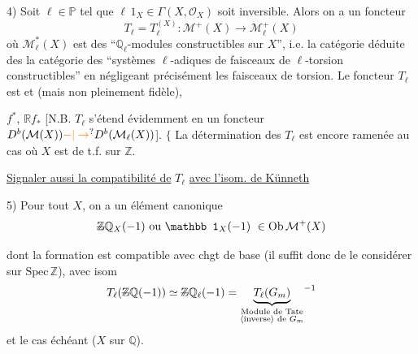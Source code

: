4) Soit $\ell\in\mathbb P$ tel que $\ell\,1_X\in\Gamma(X,\mathscr O_X)$ soit %
inversible. Alors on a un foncteur %
\[
T_\ell=T_\ell^{(X)}:\mathcal M^+(X)\longrightarrow\mathcal M_\ell^+(X) %
\]
où $\mathcal M_\ell^{*}(X)$ est   des ``$\mathbb Q_\ell$-modules %
constructibles sur $X$'', i.e. la catégorie %
déduite des la catégorie des ``systèmes %
$\ell$-adiques de faisceaux de $\ell$-torsion %
constructibles'' en négligeant précisément %
les faisceaux de torsion. Le foncteur %
$T_\ell$ est   et  (mais non %
pleinement fidèle),  %

 $f^*$,  %
 $\mathbb R f_*$ [N.B. $T_\ell$ s'étend %
évidemment en un foncteur %
$D^b(\mathcal M(X))\unsure{-|\to}D^b(\mathcal M_\ell(X))$]. $\{$ La détermination %
des $T_\ell$ est encore ramenée au cas où %
$X$ est de t.f. sur $\mathbb Z$. %

\uline{Signaler aussi la compatibilité de} $T_\ell$ \uline{avec l'isom. de Künneth} %

5) Pour tout $X$, on a un  %
élément canonique %
\[
\deleted{\mathbb Z}\mathbb Q_X(-1)\ \text{ou}\ \mathbb 1_X(-1)\ \in\mathrm{Ob}\,\mathcal M^+(X) %
\]

dont la formation est compatible avec chgt %
de base (il suffit donc de le considérer %
sur $\mathrm{Spec}\,\mathbb Z$), avec  isom %
\[
T_\ell(\deleted{\mathbb Z}\mathbb Q(-1))\simeq\deleted{\mathbb Z}\mathbb Q_\ell(-1)={\underbrace{T_\ell(G_m)}_{\substack{\text{Module de Tate}\\\text{\inserted{inverse} de }G_m}}}^{-1} %
\]
et le cas échéant ($X$ sur $\mathbb Q$). %

